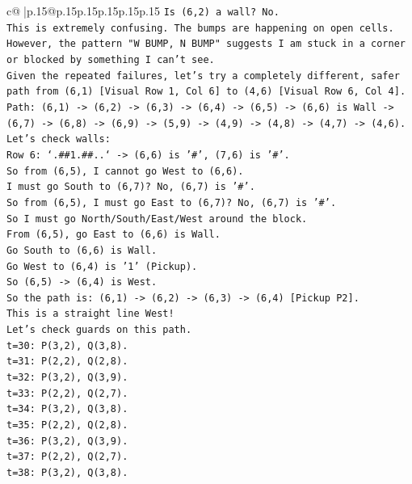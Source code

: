 \documentclass{article}
\begin{document}
{\begin{supertabular}{c@{$\;$}|p{.15\linewidth}@{}p{.15\linewidth}p{.15\linewidth}p{.15\linewidth}p{.15\linewidth}p{.15\linewidth}}
{{{\texttt{Is (6,2) a wall? No.} \\
\texttt{This is extremely confusing. The bumps are happening on open cells.} \\
\texttt{However, the pattern "W BUMP, N BUMP" suggests I am stuck in a corner or blocked by something I can't see.} \\
\texttt{Given the repeated failures, let's try a completely different, safer path from (6,1) {[}Visual Row 1, Col 6{]} to (4,6) {[}Visual Row 6, Col 4{]}.} \\
\texttt{Path: (6,1) {-}> (6,2) {-}> (6,3) {-}> (6,4) {-}> (6,5) {-}> (6,6) is Wall {-}> (6,7) {-}> (6,8) {-}> (6,9) {-}> (5,9) {-}> (4,9) {-}> (4,8) {-}> (4,7) {-}> (4,6).} \\
\texttt{Let's check walls:} \\
\texttt{Row 6: `.\#\#1.\#\#..` {-}> (6,6) is '\#', (7,6) is '\#'.} \\
\texttt{So from (6,5), I cannot go West to (6,6).} \\
\texttt{I must go South to (6,7)? No, (6,7) is '\#'.} \\
\texttt{So from (6,5), I must go East to (6,7)? No, (6,7) is '\#'.} \\
\texttt{So I must go North/South/East/West around the block.} \\
\texttt{From (6,5), go East to (6,6) is Wall.} \\
\texttt{Go South to (6,6) is Wall.} \\
\texttt{Go West to (6,4) is '1' (Pickup).} \\
\texttt{So (6,5) {-}> (6,4) is West.} \\
\texttt{So the path is: (6,1) {-}> (6,2) {-}> (6,3) {-}> (6,4) {[}Pickup P2{]}.} \\
\texttt{This is a straight line West!} \\
\texttt{Let's check guards on this path.} \\
\texttt{t=30: P(3,2), Q(3,8).} \\
\texttt{t=31: P(2,2), Q(2,8).} \\
\texttt{t=32: P(3,2), Q(3,9).} \\
\texttt{t=33: P(2,2), Q(2,7).} \\
\texttt{t=34: P(3,2), Q(3,8).} \\
\texttt{t=35: P(2,2), Q(2,8).} \\
\texttt{t=36: P(3,2), Q(3,9).} \\
\texttt{t=37: P(2,2), Q(2,7).} \\
\texttt{t=38: P(3,2), Q(3,8).} \\
}}}
\end{supertabular}}
\end{document}
